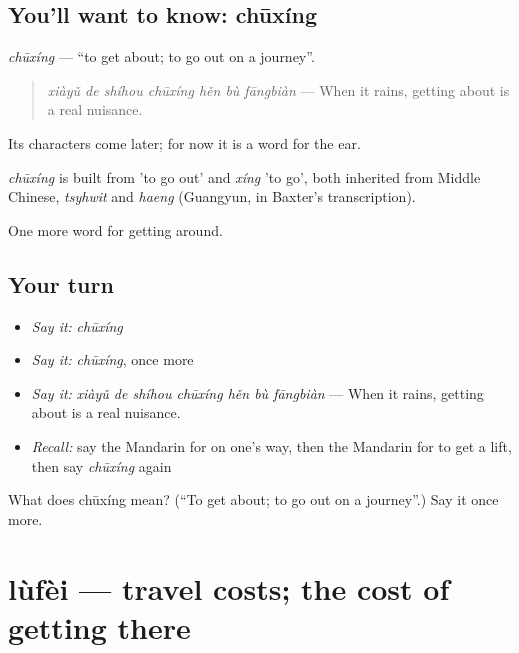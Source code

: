 \subsection*{You'll want to know: chūxíng}
\emph{chūxíng} — \textquotedblleft{}to get about; to go out on a journey\textquotedblright{}.

\begin{quote}
\emph{xiàyǔ de shíhou chūxíng hěn bù fāngbiàn} — When it rains, getting about is a real nuisance.
\end{quote}

Its characters come later; for now it is a word for the ear.

\begin{cousinweb}
\emph{chūxíng} is built from  'to go out' and \emph{xíng} 'to go', both inherited from Middle Chinese, \emph{tsyhwit} and \emph{haeng} (Guangyun, in Baxter's transcription).
\end{cousinweb}

\begin{grammarlens}[title={What you've built}]
One more word for getting around.
\end{grammarlens}

\subsection*{Your turn}
\begin{itemize}
\raggedright
  \item \emph{Say it:} \emph{chūxíng}
  \item \emph{Say it:} \emph{chūxíng}, once more
  \item \emph{Say it:} \emph{xiàyǔ de shíhou chūxíng hěn bù fāngbiàn} — When it rains, getting about is a real nuisance.
  \item \emph{Recall:} say the Mandarin for on one's way, then the Mandarin for to get a lift, then say \emph{chūxíng} again
\end{itemize}

\begin{tcolorbox}[breakable,colback=teal!4,colframe=teal!35!black,title={Before you move on}]
What does chūxíng mean? (\textquotedblleft{}To get about; to go out on a journey\textquotedblright{}.) Say it once more.
\end{tcolorbox}
\section[lùfèi]{lùfèi — travel costs; the cost of getting there}

